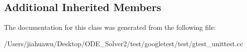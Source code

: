 \subsection*{Additional Inherited Members}


The documentation for this class was generated from the following file\+:\begin{DoxyCompactItemize}
\item 
/\+Users/jiahuawu/\+Desktop/\+O\+D\+E\+\_\+\+Solver2/test/googletest/test/gtest\+\_\+unittest.\+cc\end{DoxyCompactItemize}

